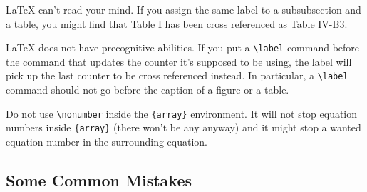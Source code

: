         {\LaTeX} can't read your mind.
        If you assign the same label to a subsubsection and a table, you might find that Table I has been cross referenced as Table IV-B3.

        {\LaTeX} does not have precognitive abilities.
        If you put a \verb|\label| command before the command that updates the counter it's supposed to be using, the label will pick up the last counter to be cross referenced instead. In particular, a \verb|\label| command should not go before the caption of a figure or a table.

        Do not use \verb|\nonumber| inside the \verb|{array}| environment.
        It will not stop equation numbers inside \verb|{array}| (there won't be any anyway) and it might stop a wanted equation number in the
        surrounding equation.

    \subsection{Some Common Mistakes}\label{SCM}

